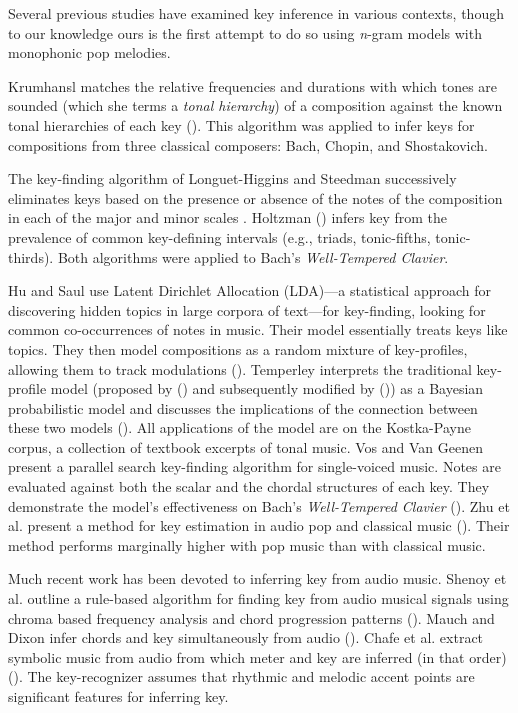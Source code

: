 \documentclass[letterpaper]{article}
\begin{document}
Several previous studies have examined key inference in various contexts, though to our knowledge ours is the first attempt to do so using \emph{n}-gram models with monophonic pop melodies.

Krumhansl matches the relative frequencies and durations with which tones are sounded (which she terms a \emph{tonal hierarchy}) of a composition against the known tonal hierarchies of each key (\citeyear{krumhansl2001cognitive}). This algorithm was applied to infer keys for compositions from three classical composers: Bach, Chopin, and Shostakovich. 

The key-finding algorithm of Longuet-Higgins and Steedman successively eliminates keys based on the presence or absence of the notes of the composition in each of the major and minor scales \cite{longuet1971interpreting}. Holtzman (\citeyear{holtzman1977program}) infers key from the prevalence of common key-defining intervals (e.g., triads, tonic-fifths, tonic-thirds). Both algorithms were applied to Bach's \emph{Well-Tempered Clavier}.

Hu and Saul use Latent Dirichlet Allocation (LDA)---a statistical approach for discovering hidden topics in large corpora of text---for key-finding, looking for common co-occurrences of notes in music. Their model essentially treats keys like topics. They then model compositions as a random mixture of key-profiles, allowing them to track modulations (\citeyear{hu2009probabilistic}). Temperley interprets the traditional key-profile model (proposed by \citeauthor{krumhansl2001cognitive} (\citeyear{krumhansl2001cognitive}) and subsequently modified by \citeauthor{temperley1999s} (\citeyear{temperley1999s})) as a Bayesian probabilistic model and discusses the implications of the connection between these two models (\citeyear{temperley2002bayesian}). All applications of the model are on the Kostka-Payne corpus, a collection of textbook excerpts of tonal music. Vos and Van Geenen present a parallel search key-finding algorithm for single-voiced music. Notes are evaluated against both the scalar and the chordal structures of each key. They demonstrate the model's effectiveness on Bach's \emph{Well-Tempered Clavier} (\citeyear{vos1996parallel}). Zhu et al. present a method for key estimation in audio pop and classical music (\citeyear{zhu2005music}). Their method performs marginally higher with pop music than with classical music. 

Much recent work has been devoted to inferring key from audio music. Shenoy et al. outline a rule-based algorithm for finding key from audio musical signals using chroma based frequency analysis and chord progression patterns (\citeyear{shenoy2004key}). Mauch and Dixon infer chords and key simultaneously from audio (\citeyear{mauch2010simultaneous}). Chafe et al. extract symbolic music from audio from which meter and key are inferred (in that order) (\citeyear{chafe1982toward}). The key-recognizer assumes that rhythmic and melodic accent points are significant features for inferring key.
\end{document}
